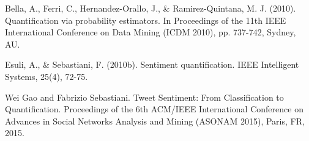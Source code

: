 \documentclass[12pt]{article}
\begin{document}
\begin{thebibliography}{99}
 Bella, A., Ferri, C., Hernandez-Orallo, J., \& Ramirez-Quintana, M. J. (2010). Quantification via probability estimators. In Proceedings of the 11th IEEE International Conference on Data Mining (ICDM 2010), pp. 737-742, Sydney, AU.

 Esuli, A., \& Sebastiani, F. (2010b). Sentiment quantification. IEEE Intelligent Systems, 25(4), 72-75.

 Wei Gao and Fabrizio Sebastiani. Tweet Sentiment: From Classification to Quantification. Proceedings of the 6th ACM/IEEE International Conference on Advances in Social Networks Analysis and Mining (ASONAM 2015), Paris, FR, 2015.

\end{thebibliography}






\end{document}
